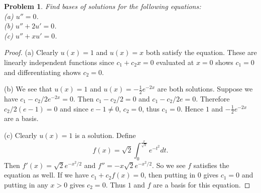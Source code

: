 \documentclass{article}
\newtheorem{problem}{Problem}
\begin{document}
\begin{problem}
Find bases of solutions for the following equations:\\
(a) $u'' = 0$.\\
(b) $u'' + 2u' = 0$.\\
(c) $u'' + xu' = 0$.
\end{problem}
\begin{proof}
(a) Clearly $u(x) = 1$ and $u(x) = x$ both satisfy the equation. These are linearly independent functions since $c_1 + c_2 x = 0$ evaluated at $x = 0$ shows $c_1 = 0$ and differentiating shows $c_2 = 0$.

(b) We see that $u(x) = 1$ and $u(x) = - \frac{1}{2} e^{-2x}$ are both solutions. Suppose we have $c_1 - c_2/2 e^{-2x} = 0$. Then $c_1 - c_2/2 = 0$ and $c_1 - c_2/2 e = 0$. Therefore $c_2/2(e-1) = 0$ and since $e-1 \neq 0$, $c_2 = 0$, thus $c_1 = 0$. Hence $1$ and $-\frac{1}{2} e^{-2x}$ are a basis.

(c) Clearly $u(x) = 1$ is a solution. Define
\[
f(x) = \sqrt{2} \int_0^{\frac{x}{\sqrt{2}}} e^{-t^2} dt.
\]
Then $f'(x) = \sqrt{2} e^{-x^2/2}$ and $f'' = -x\sqrt{2} e^{-x^2/2}$. So we see $f$ satisfies the equation as well. If we have $c_1 + c_2 f(x) = 0$, then putting in $0$ gives $c_1 = 0$ and putting in any $x > 0$ gives $c_2 = 0$. Thus $1$ and $f$ are a basis for this equation.
\end{proof}
\end{document}

